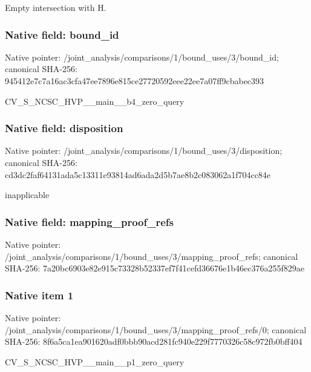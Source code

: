 \documentclass[10pt,a4paper]{article}
\begin{document}
\begingroup\raggedright\sloppy Empty intersection with H.\par\endgroup

\subsubsection{Native field: bound\_\allowbreak{}id}
Native pointer: /joint\_\allowbreak{}analysis/comparisons/1/bound\_\allowbreak{}uses/3/bound\_\allowbreak{}id; canonical SHA-256: 945412e7c7a16ac3cfa47ee7896e815ce27720592eee22ee7a07ff9cbabec393

\begingroup\raggedright\sloppy CV\_\allowbreak{}S\_\allowbreak{}NCSC\_\allowbreak{}HVP\_\allowbreak{}\_\allowbreak{}main\_\allowbreak{}\_\allowbreak{}b4\_\allowbreak{}zero\_\allowbreak{}query\par\endgroup

\subsubsection{Native field: disposition}
Native pointer: /joint\_\allowbreak{}analysis/comparisons/1/bound\_\allowbreak{}uses/3/disposition; canonical SHA-256: cd3dc2faf64131ada5c13311e93814ad6ada2d5b7ae8b2c083062a1f704cc84e

\begingroup\raggedright\sloppy inapplicable\par\endgroup

\subsubsection{Native field: mapping\_\allowbreak{}proof\_\allowbreak{}refs}
Native pointer: /joint\_\allowbreak{}analysis/comparisons/1/bound\_\allowbreak{}uses/3/mapping\_\allowbreak{}proof\_\allowbreak{}refs; canonical SHA-256: 7a20bc6903e82e915c73328b52337ef7f41cefd36676e1b46ec376a255f829ae

\subsubsection{Native item 1}
Native pointer: /joint\_\allowbreak{}analysis/comparisons/1/bound\_\allowbreak{}uses/3/mapping\_\allowbreak{}proof\_\allowbreak{}refs/0; canonical SHA-256: 8f6a5ca1ea901620adf0bbb90acd281fc940e229f7770326c58c972fb0bff404

\begingroup\raggedright\sloppy CV\_\allowbreak{}S\_\allowbreak{}NCSC\_\allowbreak{}HVP\_\allowbreak{}\_\allowbreak{}main\_\allowbreak{}\_\allowbreak{}p1\_\allowbreak{}zero\_\allowbreak{}query\par\endgroup
\end{document}
